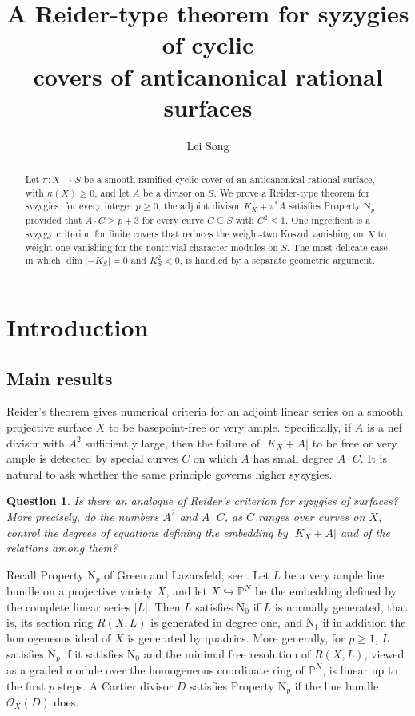 \documentclass[11pt,reqno]{amsart}
\title[A Reider-type theorem for syzygies of cyclic covers]{A Reider-type theorem for syzygies of cyclic\\ covers
of anticanonical rational surfaces}
\author{Lei Song}
\numberwithin{equation}{section}
\newtheorem{question}[theorem]{Question}
\theoremstyle{remark}
\newcommand{\sshf}[1]{\mathcal{O}_{#1}}
\newcommand{\prj}[1]{\mathbb{P}^{#1}}
\newcommand{\NP}{\mathrm N}
\begin{document}
\begin{abstract}
Let $\pi\colon X\to S$ be a smooth ramified cyclic cover of an
anticanonical rational surface, with $\kappa(X)\geq0$, and let $A$ be a divisor on $S$. We prove a Reider-type theorem for syzygies: for every integer $p\ge 0$, the adjoint divisor $K_X+\pi^*A$ satisfies Property $\mathrm{N}_p$ provided that $A\cdot C\geq p+3$ for every curve $C\subseteq S$ with $C^2\le 1$. One ingredient is a syzygy criterion for finite covers that reduces the weight-two Koszul vanishing on $X$ to weight-one vanishing for the nontrivial character modules on $S$. The most delicate case, in which $\dim|-K_S|=0$ and $K_S^2<0$, is handled by a separate geometric argument.
\end{abstract}
\maketitle

\begingroup\small\tableofcontents\endgroup

\section{Introduction}
\subsection{Main results}
Reider's theorem \cite{Reider88} gives numerical criteria for an adjoint linear
series on a smooth projective surface $X$ to be basepoint-free or very ample. Specifically, if $A$ is a nef divisor with $A^2$ sufficiently large, then the failure of $|K_X+A|$ to be free or very ample is detected by special curves $C$ on which $A$ has small degree $A\cdot C$. It is natural to ask whether the same principle governs higher syzygies.
\begin{question}\label{existence of Reider-type syzygy theorem}
Is there an analogue of Reider's criterion for syzygies of surfaces? More precisely, do the numbers $A^2$ and $A\cdot C$, as $C$ ranges over curves on $X$, control the degrees of equations defining the embedding by $|K_X+A|$ and of the relations among them?
\end{question}


Recall Property $\NP_p$ of Green and Lazarsfeld; see \cite[Section~6.1]{EL26}. Let $L$ be a very ample line bundle on a projective variety $X$, and let $X\hookrightarrow\prj{N}$ be the embedding defined by the complete linear series $|L|$. Then $L$ satisfies $\NP_0$ if $L$ is normally generated, that is, its section ring \(R(X,L)\) is generated in degree
one, and $\NP_1$ if in addition the homogeneous ideal of $X$ is generated by quadrics. More generally, for $p\ge 1$, $L$ satisfies $\NP_p$ if it satisfies $\NP_0$ and the minimal free resolution of \(R(X,L)\), viewed as a graded module over the homogeneous coordinate ring of $\prj{N}$, is linear up to the first $p$ steps. A Cartier divisor $D$ satisfies Property $\NP_p$ if the line bundle $\sshf{X}(D)$ does.
\end{document}
